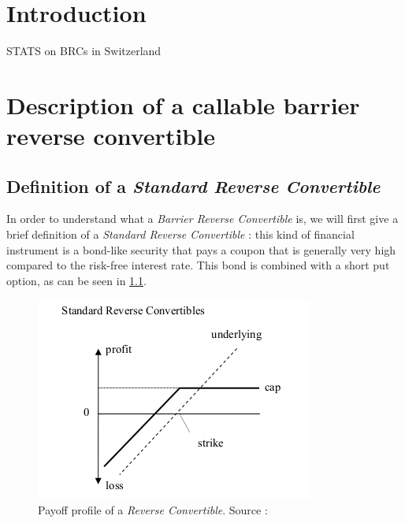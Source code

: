 \documentclass[a4paper,11pt,english]{book}
\begin{document}
\pagestyle{empty}
\tableofcontents
\listoffigures
\listoftables

\mainmatter
\chapter*{Introduction}
\vspace*{-2cm}

STATS on BRCs in Switzerland

\pagestyle{fancy}

\chapter{Description of a callable barrier reverse convertible}

\section{Definition of a \textit{Standard Reverse Convertible}}
In order to understand what a \textit{Barrier Reverse Convertible} is, we will first give a brief definition of a \textit{Standard Reverse Convertible} : this kind of financial instrument is a bond-like security that pays a coupon that is generally very high compared to the risk-free interest rate. This bond is combined with a short put option, as can be seen in \ref{fig:RC-payoff}.

\begin{figure}[!h]
    \centering
    \includegraphics[scale=0.7]{images/RC.png}
    \caption{Payoff profile of a \textit{Reverse Convertible}. Source : \cite{lindauer2008pricing}}
    \label{fig:RC-payoff}
\end{figure}
\end{document}
